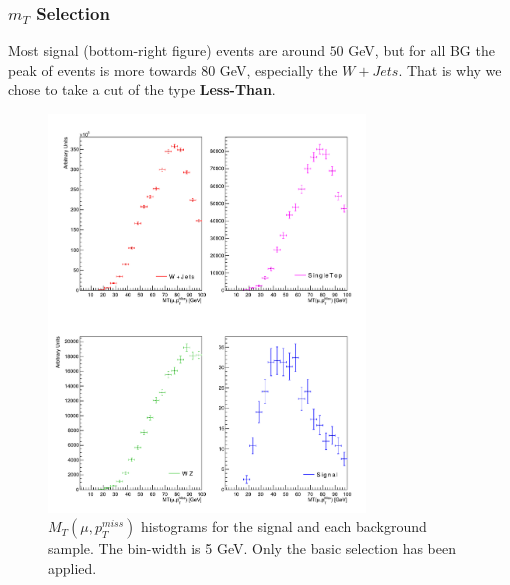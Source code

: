 \documentclass{beamer}
\begin{document}

\begin{frame}
\frametitle{$m_T$ Selection}

\begin{justify}
{\tiny Most signal (bottom-right figure) events are around $50$ GeV, but for all BG the peak of events is more towards $80$ GeV, especially the $W+Jets$. That is why we chose to take a cut of the type \textbf{Less-Than}.}
\end{justify}

\begin{figure}[!h]
\centering
\includegraphics[width=0.75\textwidth, height=0.63\textheight]{pictures/Selection/m_T/All-m_T}
\caption{{\scriptsize $M_T(\mu,p^{miss}_T)$ histograms for the signal and each background sample. The bin-width is 5 GeV. Only the basic selection has been applied.}}
\label{All-m_T}

\end{figure}

\end{frame}

\end{document}
